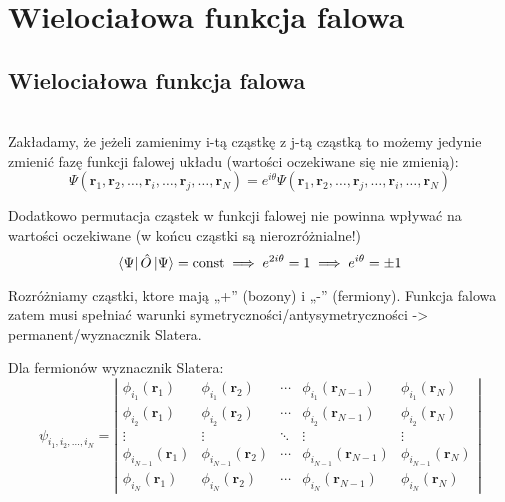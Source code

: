 \section{Wielociałowa funkcja falowa}

\subsection{Wielociałowa funkcja falowa}
~\\
Zakładamy, że jeżeli zamienimy i-tą cząstkę z j-tą cząstką to możemy jedynie zmienić fazę funkcji falowej układu (wartości oczekiwane się nie zmienią):
$$ \Psi\left(\boldsymbol{r}_{1},\boldsymbol{r}_{2},\ldots,\boldsymbol{r}_{i},\ldots,\boldsymbol{r}_{j},\ldots,\boldsymbol{r}_{N}\right)=e^{i\theta}\Psi\left(\boldsymbol{r}_{1},\boldsymbol{r}_{2},\ldots,\boldsymbol{r}_{j},\ldots,\boldsymbol{r}_{i},\ldots,\boldsymbol{r}_{N}\right)
$$

Dodatkowo permutacja cząstek w funkcji falowej nie powinna wpływać na wartości oczekiwane (w końcu cząstki są nierozróżnialne!)
$$\bra{\Psi}\hat{O}\ket{\Psi}=\text{{const}}\implies e^{2i\theta}=1\implies e^{i\theta}=\pm1$$


Rozróżniamy cząstki, ktore mają „+” (bozony) i „-” (fermiony). Funkcja falowa zatem musi spełniać warunki symetryczności/antysymetryczności -> permanent/wyznacznik Slatera.

Dla fermionów wyznacznik Slatera:
$$
\psi_{i_{1},i_{2},\ldots,i_{N}}=\left\vert \begin{array}{ccccc}
\phi_{i_{1}}\left(\boldsymbol{r}_{1}\right) & \phi_{i_{1}}\left(\boldsymbol{r}_{2}\right) & \cdots & \phi_{i_{1}}\left(\boldsymbol{r}_{N-1}\right) & \phi_{i_{1}}\left(\boldsymbol{r}_{N}\right)\\
\phi_{i_{2}}\left(\boldsymbol{r}_{1}\right) & \phi_{i_{2}}\left(\boldsymbol{r}_{2}\right) & \cdots & \phi_{i_{2}}\left(\boldsymbol{r}_{N-1}\right) & \phi_{i_{2}}\left(\boldsymbol{r}_{N}\right)\\
\vdots & \vdots & \ddots & \vdots & \vdots\\
\phi_{i_{N-1}}\left(\boldsymbol{r}_{1}\right) & \phi_{i_{N-1}}\left(\boldsymbol{r}_{2}\right) & \cdots & \phi_{i_{N-1}}\left(\boldsymbol{r}_{N-1}\right) & \phi_{i_{N-1}}\left(\boldsymbol{r}_{N}\right)\\
\phi_{i_{N}}\left(\boldsymbol{r}_{1}\right) & \phi_{i_{N}}\left(\boldsymbol{r}_{2}\right) & \cdots & \phi_{i_{N}}\left(\boldsymbol{r}_{N-1}\right) & \phi_{i_{N}}\left(\boldsymbol{r}_{N}\right)
\end{array}\right\vert 
$$


